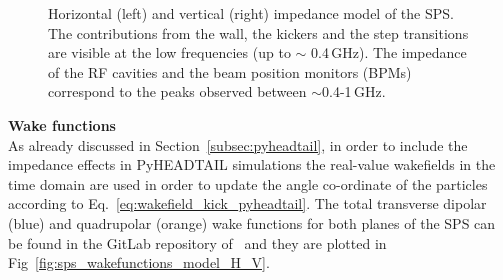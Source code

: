 \begin{figure}[!ht]
\begin{subfigure}[t]{0.45\textwidth}
    \end{subfigure}
    \hfill
     \caption{Horizontal (left) and vertical (right) impedance model of the SPS. The contributions from the wall, the kickers and the step transitions are visible at the low frequencies (up to $\sim$ 0.4\,GHz). The impedance of the RF cavities and the beam position monitors (BPMs) correspond to the peaks observed between $\sim$0.4-1\,GHz.}
     
     \label{fig:sps_impedance_model_H_V}
 \end{figure}



\normalsize{\textbf{Wake functions}}\\
As already discussed in Section~\ref{subsec:pyheadtail}, in order to include the impedance effects in PyHEADTAIL simulations the real-value wakefields in the time domain are used in order to update the angle co-ordinate of the particles according to Eq.~\eqref{eq:wakefield_kick_pyheadtail}.
The total transverse dipolar (blue) and quadrupolar (orange) wake functions for both planes of the SPS can be found in the GitLab repository of~\cite{sps_impedance_model_git} and they are plotted in Fig~\ref{fig:sps_wakefunctions_model_H_V}.


